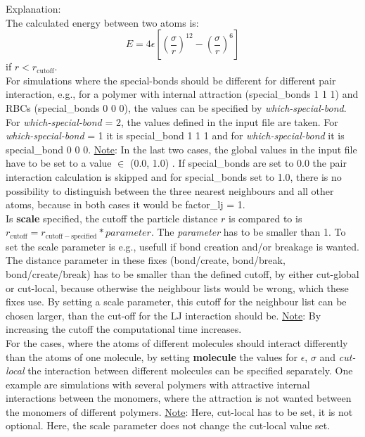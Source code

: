 Explanation:
\\[2ex]
The calculated energy between two atoms is:
\begin{equation}\label{eq:LJ/own}
E = 4\epsilon \left[ \left( \frac{\sigma}{r} \right)^{12} -  \left(  \frac{\sigma}{r} \right)^6 \right]
\end{equation}
if $r<r_\mathrm{cutoff}$.
\\[2ex]
For simulations where the special-bonds should be different for different pair interaction, e.g., for a polymer with internal attraction (special\_bonds 1 1 1) and RBCs (special\_bonds 0 0 0), the values can be specified by \textit{which-special-bond}. For \textit{which-special-bond} = 2, the values defined in the input file are taken.
For \textit{which-special-bond} = 1 it is special\_bond 1 1 1 and for  \textit{which-special-bond} it is special\_bond 0 0 0.
\underline{Note}: In the last two cases, the global values in the input file have to be set to a value $\in$ (0.0, 1.0) .
If special\_bonds are set to 0.0 the pair interaction calculation is skipped and for special\_bonds set to 1.0, there is no possibility to distinguish between the three nearest neighbours and all other atoms, because in both cases it would be factor\_lj = 1.
\\[2ex]
Is \textbf{scale} specified, the cutoff the particle distance $r$ is compared to is $r_\mathrm{cutoff} = r_\mathrm{cutoff - specified}*{parameter}$.
The \textit{parameter} has to be smaller than 1.
To set the scale parameter is e.g., usefull if bond creation and/or breakage is wanted.
The distance parameter in these fixes (bond/create, bond/break, bond/create/break) has to be smaller than the defined cutoff, by either cut-global or cut-local, because otherwise the neighbour lists would be wrong, which these fixes use.
By setting a scale parameter, this cutoff for the neighbour list can be chosen larger, than the cut-off for the LJ interaction should be.
\underline{Note}: By increasing the cutoff the computational time increases.
\\[2ex]
For the cases, where the atoms of different molecules should interact differently than the atoms of one molecule, by setting \textbf{molecule} the values for $\epsilon$, $\sigma$ and \textit{cut-local} the interaction between different molecules can be specified separately.
One example are simulations with several polymers with attractive internal interactions between the monomers, where the attraction is not wanted between the monomers of different polymers.
\underline{Note}: Here, cut-local has to be set, it is not optional. Here, the scale parameter does not change the cut-local value set.


